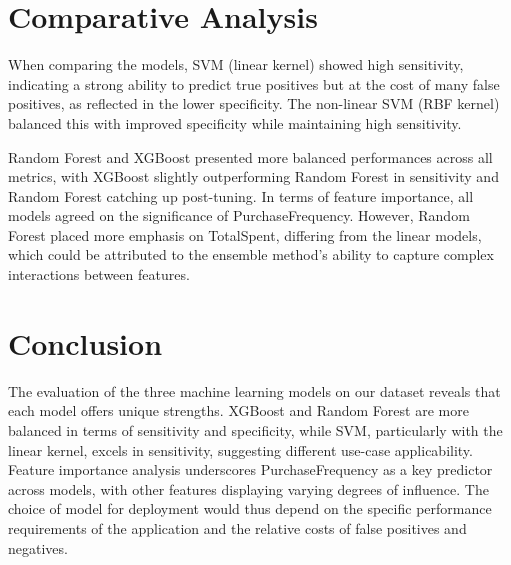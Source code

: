 \documentclass[12pt]{article}
\begin{document}
\medskip
\section*{Comparative Analysis}
When comparing the models, SVM (linear kernel) showed high sensitivity, indicating a strong ability to predict true positives but at the cost of many false positives, as reflected in the lower specificity. The non-linear SVM (RBF kernel) balanced this with improved specificity while maintaining high sensitivity.

\medskip
Random Forest and XGBoost presented more balanced performances across all metrics, with XGBoost slightly outperforming Random Forest in sensitivity and Random Forest catching up post-tuning. In terms of feature importance, all models agreed on the significance of PurchaseFrequency. However, Random Forest placed more emphasis on TotalSpent, differing from the linear models, which could be attributed to the ensemble method's ability to capture complex interactions between features.

\medskip
\section*{Conclusion}
The evaluation of the three machine learning models on our dataset reveals that each model offers unique strengths. XGBoost and Random Forest are more balanced in terms of sensitivity and specificity, while SVM, particularly with the linear kernel, excels in sensitivity, suggesting different use-case applicability. Feature importance analysis underscores PurchaseFrequency as a key predictor across models, with other features displaying varying degrees of influence. The choice of model for deployment would thus depend on the specific performance requirements of the application and the relative costs of false positives and negatives.

\medskip
\end{document}

